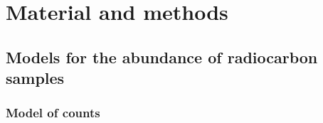 \documentclass[a4paper]{article}
\begin{document}




\section*{\centering Material and methods}


\subsection*{Models for the abundance of radiocarbon samples}

\subsubsection*{Model of counts}
\end{document}
